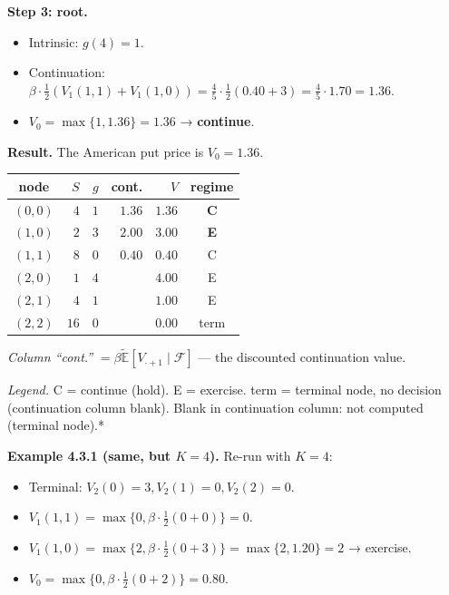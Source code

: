 \documentclass[
  10pt,
  twoside]{book}
\newcounter{none} %
\providecommand{\tightlist}{%
  \setlength{\itemsep}{0pt}\setlength{\parskip}{0pt}}
\begin{document}
\textbf{Step 3: root.}

\begin{itemize}
\tightlist
\item
  Intrinsic: \(g(4) = 1\).
\item
  Continuation:
  \(\beta\!\cdot\!\tfrac{1}{2}(V_1(1, 1) + V_1(1, 0)) = \tfrac{4}{5}\!\cdot\!\tfrac{1}{2}(0.40 + 3) = \tfrac{4}{5}\!\cdot 1.70 = 1.36\).
\item
  \(V_0 = \max\{1, 1.36\} = 1.36\) → \textbf{continue}.
\end{itemize}

\textbf{Result.} The American put price is \(V_0 = 1.36\).

{\def\LTcaptype{none} %
\begin{table}[H]
\centering
\begin{tabular}{|c|r|r|r|r|c|}
\toprule
node & \(S\) & \(g\) & cont. & \(V\) & regime \\
\midrule



\((0, 0)\) & \(\phantom{0}4\) & \(1\) & \(1.36\) & \(1.36\) &
\textbf{C} \\
\((1, 0)\) & \(\phantom{0}2\) & \(3\) & \(2.00\) & \(3.00\) &
\textbf{E} \\
\((1, 1)\) & \(\phantom{0}8\) & \(0\) & \(0.40\) & \(0.40\) & C \\
\((2, 0)\) & \(\phantom{0}1\) & \(4\) & & \(4.00\) & E \\
\((2, 1)\) & \(\phantom{0}4\) & \(1\) & & \(1.00\) & E \\
\((2, 2)\) & \(16\) & \(0\) & & \(0.00\) & term \\
\bottomrule
\end{tabular}
\end{table}
}

\emph{Column ``cont.''}
\(= \beta\tilde{\mathbb E}[V_{\cdot+1} \mid \mathcal F]\) --- the
discounted continuation value.

\emph{Legend.} C = continue (hold). E = exercise. term = terminal node,
no decision (continuation column blank). Blank in continuation column:
not computed (terminal node).*

\textbf{Example 4.3.1 (same, but \(K = 4\)).} Re-run with \(K = 4\):

\begin{itemize}
\tightlist
\item
  Terminal: \(V_2(0) = 3, V_2(1) = 0, V_2(2) = 0\).
\item
  \(V_1(1, 1) = \max\{0, \beta \cdot \tfrac{1}{2}(0+0)\} = 0\).
\item
  \(V_1(1, 0) = \max\{2, \beta\cdot \tfrac{1}{2}(0 + 3)\} = \max\{2, 1.20\} = 2\)
  → exercise.
\item
  \(V_0 = \max\{0, \beta\cdot\tfrac{1}{2}(0 + 2)\} = 0.80\).
\end{itemize}
\end{document}
